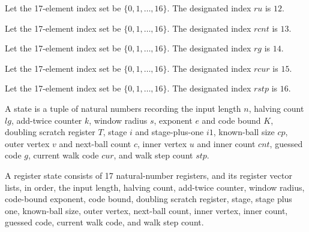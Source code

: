 \begin{definition}
\label{Complexity.LogProg.ISCount.ru}
\leanok
Let the 17-element index set be $\{0,1,\ldots,16\}$. The designated index $ru$ is $12$.
\end{definition}

\begin{definition}
\label{Complexity.LogProg.ISCount.rcnt}
\leanok
Let the 17-element index set be $\{0,1,\ldots,16\}$. The designated index $rcnt$ is
$13$.
\end{definition}

\begin{definition}
\label{Complexity.LogProg.ISCount.rg}
\leanok
Let the 17-element index set be $\{0,1,\ldots,16\}$. The designated index $rg$ is $14$.
\end{definition}

\begin{definition}
\label{Complexity.LogProg.ISCount.rcur}
\leanok
Let the 17-element index set be $\{0,1,\ldots,16\}$. The designated index $rcur$ is
$15$.
\end{definition}

\begin{definition}
\label{Complexity.LogProg.ISCount.rstp}
\leanok
Let the 17-element index set be $\{0,1,\ldots,16\}$. The designated index $rstp$ is
$16$.
\end{definition}

\begin{definition}
\label{Complexity.LogProg.ISCount.St}
\leanok
A state is a tuple of natural numbers recording the input length $n$, halving count
$lg$, add-twice counter $k$, window radius $s$, exponent $e$ and code bound $K$,
doubling scratch register $T$, stage $i$ and stage-plus-one $i1$, known-ball size $cp$,
outer vertex $v$ and next-ball count $c$, inner vertex $u$ and inner count $cnt$,
guessed code $g$, current walk code $cur$, and walk step count $stp$.
\end{definition}

\begin{definition}
\label{Complexity.LogProg.ISCount.St.toV}
\leanok
{}
A register state consists of 17 natural-number registers, and its register vector lists,
in order, the input length, halving count, add-twice counter, window radius, code-bound
exponent, code bound, doubling scratch register, stage, stage plus one, known-ball size,
outer vertex, next-ball count, inner vertex, inner count, guessed code, current walk
code, and walk step count.
\end{definition}

